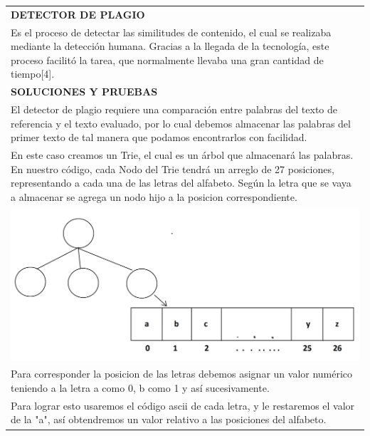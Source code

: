 \documentclass[9pt]{article}
\begin{document}
\begin{longtable}{|p{15cm}|}
		\textbf{DETECTOR DE PLAGIO}  \\
		Es el proceso de detectar las similitudes de contenido, el cual se realizaba mediante la detección humana. Gracias a la llegada de la tecnología, este proceso  facilitó la tarea, que normalmente llevaba una gran cantidad de tiempo[4].\\	
		\hline 
		\rowcolor{tablebackground}
		\color{white}\textbf{SOLUCIONES Y PRUEBAS}  \\
		\hline
		El detector de plagio requiere una comparación entre palabras del texto de referencia y el texto evaluado, por lo cual debemos almacenar las palabras del primer texto de tal manera que podamos encontrarlos con facilidad.\\
		En este caso creamos un Trie, el cual es un árbol que almacenará las palabras. En nuestro código, cada Nodo del Trie tendrá un arreglo de 27 posiciones, representando a cada una de las letras del alfabeto. Según la letra que se vaya a almacenar se agrega un nodo hijo a la posicion correspondiente.\\
		\includegraphics[width=14cm]{img/trie.png}\\
		Para corresponder la posicion de las letras debemos asignar un valor numérico teniendo a la letra a como 0, b como 1 y así sucesivamente. \\
		Para lograr esto usaremos el código ascii de cada letra, y le restaremos el valor de la "a", así obtendremos un valor relativo a las posiciones del alfabeto.\\
		

\end{longtable}
\end{document}
